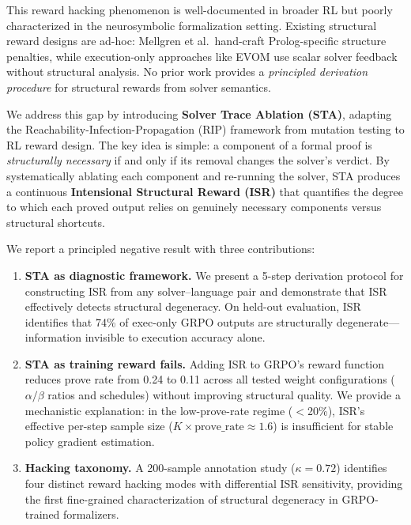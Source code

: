 \documentclass[11pt,a4paper]{article}
\begin{document}
This reward hacking phenomenon is well-documented in broader RL \cite{skalse2022defining} but poorly characterized in the neurosymbolic formalization setting.
Existing structural reward designs are ad-hoc: Mellgren et al.\ hand-craft Prolog-specific structure penalties, while execution-only approaches like EVOM use scalar solver feedback without structural analysis.
No prior work provides a \emph{principled derivation procedure} for structural rewards from solver semantics.

We address this gap by introducing \textbf{Solver Trace Ablation (STA)}, adapting the Reachability-Infection-Propagation (RIP) framework from mutation testing to RL reward design.
The key idea is simple: a component of a formal proof is \emph{structurally necessary} if and only if its removal changes the solver's verdict.
By systematically ablating each component and re-running the solver, STA produces a continuous \textbf{Intensional Structural Reward (ISR)} that quantifies the degree to which each proved output relies on genuinely necessary components versus structural shortcuts.

We report a principled negative result with three contributions:

\begin{enumerate}
    \item \textbf{STA as diagnostic framework.} We present a 5-step derivation protocol for constructing ISR from any solver--language pair and demonstrate that ISR effectively detects structural degeneracy. On held-out evaluation, ISR identifies that 74\% of exec-only GRPO outputs are structurally degenerate---information invisible to execution accuracy alone.

    \item \textbf{STA as training reward fails.} Adding ISR to GRPO's reward function reduces prove rate from 0.24 to 0.11 across all tested weight configurations ($\alpha/\beta$ ratios and schedules) without improving structural quality. We provide a mechanistic explanation: in the low-prove-rate regime ($<$20\%), ISR's effective per-step sample size ($K \times \text{prove\_rate} \approx 1.6$) is insufficient for stable policy gradient estimation.

    \item \textbf{Hacking taxonomy.} A 200-sample annotation study ($\kappa = 0.72$) identifies four distinct reward hacking modes with differential ISR sensitivity, providing the first fine-grained characterization of structural degeneracy in GRPO-trained formalizers.
\end{enumerate}
\end{document}
